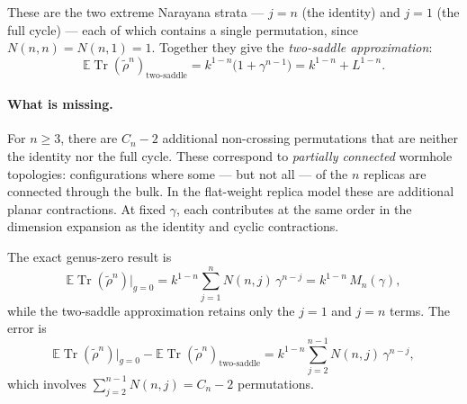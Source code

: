\documentclass[11pt,letterpaper]{article}
\theoremstyle{plain}
\theoremstyle{definition}
\theoremstyle{remark}
\begin{document}
These are the two extreme Narayana strata --- $j = n$ (the identity) and $j = 1$ (the full cycle) --- each of which contains a single permutation, since $N(n,n) = N(n,1) = 1$.  Together they give the \emph{two-saddle approximation}:
\begin{equation}
\label{eq06:two_saddle_formula}
\mathbb E\operatorname{Tr}(\widetilde\rho^n)_{\text{two-saddle}}
  = k^{1-n}\bigl(1 + \gamma^{n-1}\bigr) = k^{1-n} + L^{1-n}.
\end{equation}

\paragraph{What is missing.}
For $n \geq 3$, there are $C_n - 2$ additional non-crossing permutations that
are neither the identity nor the full cycle.  These correspond to
\emph{partially connected} wormhole topologies: configurations where some ---
but not all --- of the $n$ replicas are connected through the bulk.  In the flat-weight replica model these are additional planar contractions.
At fixed $\gamma$, each contributes at the same order in the dimension
expansion as the identity and cyclic contractions.

The exact genus-zero result is
\begin{equation}
\label{eq06:exact_genus_zero}
\mathbb E\operatorname{Tr}(\widetilde\rho^n)\big|_{g=0}
  = k^{1-n} \sum_{j=1}^{n} N(n,j)\,\gamma^{n-j}
  = k^{1-n}\,M_n(\gamma),
\end{equation}
while the two-saddle approximation retains only the $j = 1$ and $j = n$ terms.
The error is
\begin{equation}
\label{eq06:missing_saddles}
\mathbb E\operatorname{Tr}(\widetilde\rho^n)\big|_{g=0} - \mathbb E\operatorname{Tr}(\widetilde\rho^n)_{\text{two-saddle}}
  = k^{1-n} \sum_{j=2}^{n-1} N(n,j)\,\gamma^{n-j},
\end{equation}
which involves $\sum_{j=2}^{n-1} N(n,j) = C_n - 2$ permutations.
\end{document}
